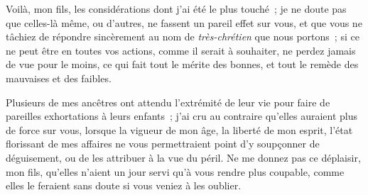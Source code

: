 \documentclass[french,twoside]{book} %
\begin{document}
Voilà, mon fils, les considérations dont j’ai été le plus touché ; je ne doute pas que celles-là même, ou d’autres, ne fassent un pareil effet sur vous, et que vous ne tâchiez de répondre sincèrement au nom de {\itshape très-chrétien} que nous portons ; si ce ne peut être en toutes vos actions, comme il serait à souhaiter, ne perdez jamais de vue pour le moins, ce qui fait tout le mérite des bonnes, et tout le remède des mauvaises et des faibles.\par
Plusieurs de mes ancêtres ont attendu l’extrémité de leur vie pour faire de pareilles exhortations à leurs enfants ; j’ai cru au contraire qu’elles auraient plus de force sur vous, lorsque la vigueur de mon âge, la liberté de mon esprit, l’état florissant de mes affaires ne vous permettraient point d’y soupçonner de déguisement, ou de les attribuer à la vue du péril. Ne me donnez pas ce déplaisir, mon fils, qu’elles n’aient un jour servi qu’à vous rendre plus coupable, comme elles le feraient sans doute si vous veniez à les oublier.
\end{document}
